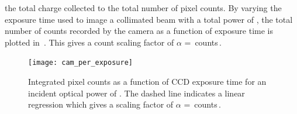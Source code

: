 the total charge collected to the total number of pixel counts. By varying the
exposure time used to image a collimated beam with a total power of
, the total number of counts recorded by the camera
as a function of exposure time is plotted in~. This
gives a count scaling factor of \(\alpha\) =
\,counts\,\sivalue{}{\per\micro\second\per\micro\watt}.
\begin{figure}[!htbp]
	\centering
	\texttt{[image: cam\_per\_exposure]}
	\caption[Integrated pixel counts as a function of CCD exposure
		time.]{Integrated pixel counts as a function of CCD exposure time for an
		incident optical power of . The dashed line
		indicates a linear regression which gives a scaling factor of \(\alpha\)
		=
		\,counts\,\sivalue{}{\per\micro\second\per\micro\watt}.}
	\label{fig:camera_counts}
\end{figure}

